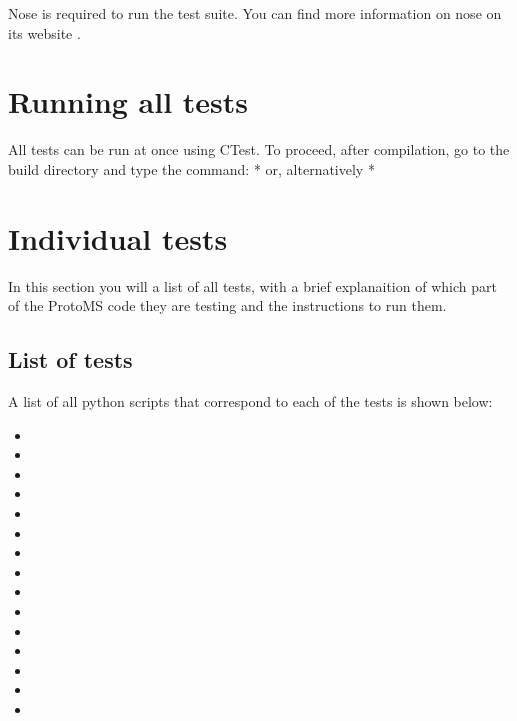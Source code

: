 \documentclass[letterpaper,10pt,english]{manual}
\begin{document}
Nose is required to run the test suite. You can find more information on nose on its website .


\section{Running all tests}

All tests can be run at once using CTest. To proceed, after compilation, go to the build directory  and type the command:
* 
or, alternatively
* 


\section{Individual tests}

In this section you will a list of all tests, with a brief explanaition of which part of the ProtoMS code they are testing and the instructions to run them.


\subsection{List of tests}

A list of all python scripts that correspond to each of the tests is shown below:
\begin{itemize}
\item {} 

\item {} 

\item {} 

\item {} 

\item {} 

\item {} 

\item {} 

\item {} 

\item {} 

\item {} 

\item {} 

\item {} 

\item {} 

\item {} 

\item {} 

\end{itemize}
\end{document}
